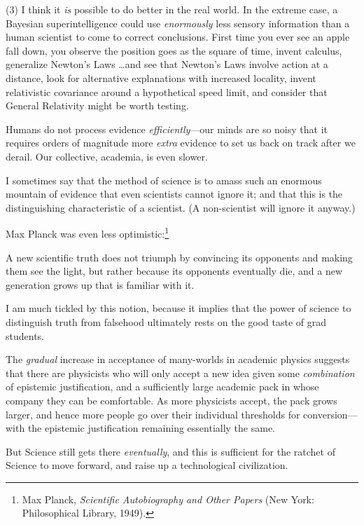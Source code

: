 {
 (3) I think it \textit{is} possible to do better in the real
world. In the extreme case, a Bayesian superintelligence could use
\textit{enormously} less sensory information than a human scientist to
come to correct conclusions. First time you ever see an apple fall
down, you observe the position goes as the square of time, invent
calculus, generalize Newton's Laws \ldots and see that
Newton's Laws involve action at a distance, look for
alternative explanations with increased locality, invent relativistic
covariance around a hypothetical speed limit, and consider that General
Relativity might be worth testing.}

{
 Humans do not process evidence \textit{efficiently}{}---our minds
are so noisy that it requires orders of magnitude more \textit{extra}
evidence to set us back on track after we derail. Our collective,
academia, is even slower.}

\myendsectiontext


\bigskip


{
 I sometimes say that the method of science is to amass such an
enormous mountain of evidence that even scientists cannot ignore it;
and that this is the distinguishing characteristic of a scientist. (A
non-scientist will ignore it anyway.) }

{
 Max Planck was even less optimistic:\footnote{Max Planck, \textit{Scientific Autobiography and Other Papers}
(New York: Philosophical Library, 1949).}}

{
 A new scientific truth does not triumph by convincing its
opponents and making them see the light, but rather because its
opponents eventually die, and a new generation grows up that is
familiar with it.}

{
 I am much tickled by this notion, because it implies that the
power of science to distinguish truth from falsehood ultimately rests
on the good taste of grad students.}

{
 The \textit{gradual} increase in acceptance of many-worlds in
academic physics suggests that there are physicists who will only
accept a new idea given some \textit{combination} of epistemic
justification, and a sufficiently large academic pack in whose company
they can be comfortable. As more physicists accept, the pack grows
larger, and hence more people go over their individual thresholds for
conversion---with the epistemic justification remaining essentially the
same.}

{
 But Science still gets there \textit{eventually}, and this is
sufficient for the ratchet of Science to move forward, and raise up a
technological civilization.}

